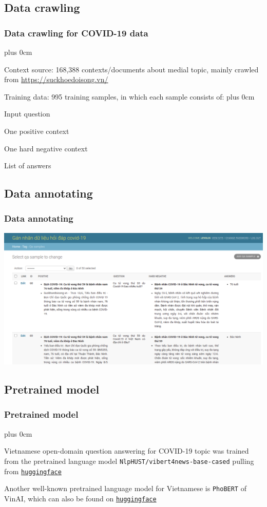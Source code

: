 \documentclass[11pt]{beamer}
\renewcommand{\raggedright}{\leftskip=0pt \rightskip=0pt plus 0cm}
\let\olditemize=\itemize
\renewenvironment{itemize}{\olditemize\raggedright}{\endlist}
\begin{document}
\subsection{Data crawling}
\begin{frame}
\frametitle{Data crawling for COVID-19 data}
\begin{itemize}
\item Context source: 168,388 contexts/documents about medial topic,  mainly crawled from \url{https://suckhoedoisong.vn/}
\item Training data: 995 training samples, in which each sample consists of:
\begin{itemize}
	\item Input question
	\item One positive context
	\item One hard negative context
	\item List of answers
\end{itemize}
\end{itemize}
\end{frame}
\subsection{Data annotating}
\begin{frame}
\frametitle{Data annotating}
\includegraphics[scale=.25]{images/annotate.png}
\end{frame}
\subsection{Pretrained model}
\begin{frame}
	\frametitle{Pretrained model}
	\begin{adjustwidth}{0em}{5em}
	\begin{itemize}
		\item Vietnamese open-domain question answering for COVID-19 topic was trained from the pretrained language model {\tt NlpHUST/vibert4news-base-cased} pulling from \href{https://huggingface.co/}{\tt huggingface}
		\item Another well-known pretrained language model for Vietnamese is {\tt PhoBERT} of VinAI, which can also be found on \href{https://huggingface.co/}{\tt huggingface}
	\end{itemize}
	\end{adjustwidth}
\end{frame}
\end{document}
